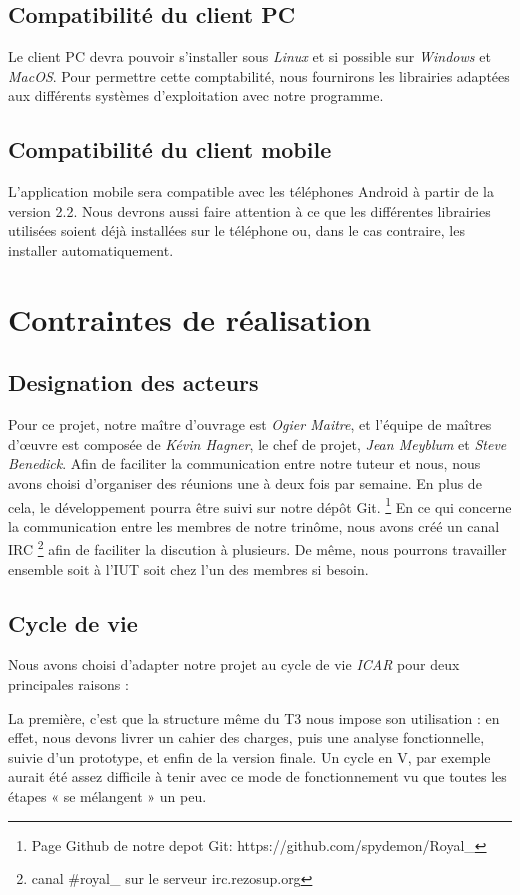 \subsection{Compatibilité du client PC}
Le client PC devra pouvoir s'installer sous \emph{Linux} et si possible sur \emph{Windows} et \emph{MacOS}. 
Pour permettre cette comptabilité, nous fournirons les librairies adaptées aux différents systèmes d'exploitation avec notre programme. 

\subsection{Compatibilité du client mobile}
L'application mobile sera compatible avec les téléphones Android à partir de la version 2.2. 
Nous devrons aussi faire attention à ce que les différentes librairies utilisées soient déjà installées sur le téléphone ou, dans le cas contraire, les installer automatiquement.

\section{Contraintes de réalisation}

\subsection{Designation des acteurs}
Pour ce projet, notre maître d'ouvrage est \emph{Ogier Maitre}, et l'équipe de maîtres d'œuvre est composée de \emph{Kévin Hagner}, le chef de projet, \emph{Jean Meyblum} et \emph{Steve Benedick}.
Afin de faciliter la communication entre notre tuteur et nous, nous avons choisi d'organiser des réunions une à deux fois par semaine. 
En plus de cela, le développement pourra être suivi sur notre dépôt Git.
\footnote{Page Github de notre depot Git: https://github.com/spydemon/Royal\_} 
En ce qui concerne la communication entre les membres de notre trinôme, nous avons créé un canal IRC \footnote{ canal \#royal\_ sur le serveur irc.rezosup.org} afin de faciliter la discution à plusieurs. 
De même, nous pourrons travailler ensemble soit à l'IUT soit chez l'un des membres si besoin.

\subsection{Cycle de vie}
Nous avons choisi d'adapter notre projet au cycle de vie \emph{ICAR} pour deux principales raisons : 

La première, c'est que la structure même du T3 nous impose son utilisation :
en effet, nous devons livrer un cahier des charges, puis une analyse fonctionnelle, suivie d'un prototype, et enfin de la version finale. 
Un cycle en V, par exemple aurait été assez difficile à tenir avec ce mode de fonctionnement vu que toutes les étapes « se mélangent » un peu. 

